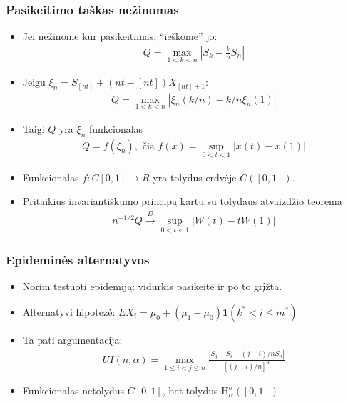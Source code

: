 \documentclass[utf8,hyperref={unicode}]{beamer}
\theoremstyle{change}\newtheorem{teorema}{Teiginys}
\theoremstyle{change}\newtheorem{salyga}{}
\newcommand{\HH}{\mathrm{H}} %
\newcommand{\Hao}{\HH_{\alpha}^o}
\newcommand{\indf}[1]{\mathbf{1}\left( #1 \right)}
\begin{document}
\begin{frame}
    \frametitle{Pasikeitimo taškas nežinomas} 
    \begin{itemize}
	\item Jei nežinome kur pasikeitimas, ``ieškome'' jo:
	    \begin{align*}
		Q=\max_{1<k<n}|S_{k}-\frac{k}{n}S_n|
	    \end{align*}
	\item Jeigu $\xi_n=S_{[nt]}+(nt-[nt])X_{[nt]+1}:$
	    \begin{align*}
		Q=\max_{1<k<n}|\xi_{n}(k/n)-k/n\xi_n(1)|
	    \end{align*}
	\item Taigi $Q$  yra  $\xi_n$ funkcionalas 	  
	    \begin{align*}
		Q=f(\xi_{n}), \text{ čia } f(x)=\sup_{0<t<1}|x(t)-x(1)|
	    \end{align*}
	\item Funkcionalas $f:C[0,1]\to R$ yra tolydus erdvėje $C([0,1])$.
	\item Pritaikius invariantiškumo principą kartu su tolydaus atvaizdžio teorema  
	    \begin{align*}
		n^{-1/2}Q\xrightarrow{D} \sup_{0<t<1}|W(t)-tW(1)|
	    \end{align*}
	    \end{itemize}
\end{frame}
\begin{frame}
    \frametitle{Epideminės alternatyvos}
    \begin{itemize}
	\item Norim testuoti epidemiją: vidurkis pasikeitė  ir po to grįžta.	
	\item Alternatyvi hipotezė:  $EX_i=\mu_0+(\mu_1-\mu_0)\indf{k^*< i\le
	    m^*}$ 
	\item Ta pati argumentacija:
	    \begin{align*}
		UI(n,\alpha)=\max_{1\le i<
		j\le n}\frac{|S_{j}-S_{i}-(j-i)/nS_n|}{[(j-i)/n]^\alpha}
	    \end{align*}
	\item Funkcionalas netolydus $C[0,1]$, bet tolydus $\Hao([0,1])$
\end{itemize}
\end{frame}
\end{document}
